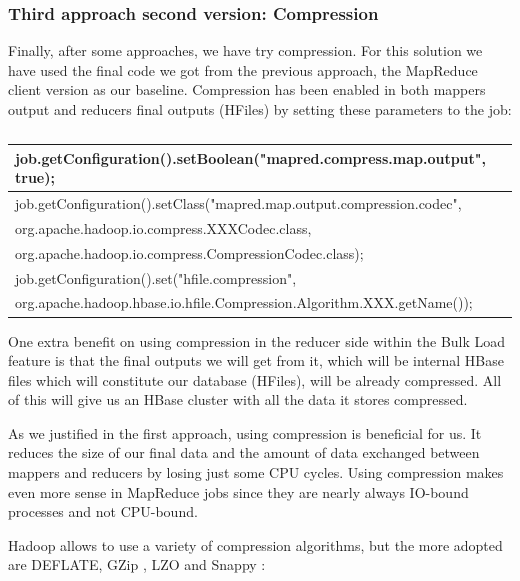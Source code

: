 \subsubsection{Third approach second version: Compression}

Finally, after some approaches, we have try compression. For this solution we have used the final code we got from the previous approach, the MapReduce client version as our baseline. Compression has been enabled in both mappers output and reducers final outputs (HFiles) by setting these parameters to the job:

\begin{table}[htbp]
\caption{}
\begin{tabular}{|l|}
\hline
job.getConfiguration().setBoolean("mapred.compress.map.output", true); \\ \hline
job.getConfiguration().setClass("mapred.map.output.compression.codec", \\ \hline
org.apache.hadoop.io.compress.XXXCodec.class, \\ \hline
org.apache.hadoop.io.compress.CompressionCodec.class); \\ \hline
job.getConfiguration().set("hfile.compression", \\ \hline
org.apache.hadoop.hbase.io.hfile.Compression.Algorithm.XXX.getName()); \\ \hline
\end{tabular}
\label{}
\end{table}

One extra benefit on using compression in the reducer side within the Bulk Load feature is that the final outputs we will get from it, which will be internal HBase files which will constitute our database (HFiles), will be already compressed. All of this will give us an HBase cluster with all the data it stores compressed.
\par
As we justified in the first approach, using compression is beneficial for us. It reduces the size of our final data and the amount of data  exchanged between mappers and reducers by losing just some CPU cycles. Using compression makes even more sense in MapReduce jobs since they are nearly always IO-bound processes and not CPU-bound.
\bigskip
\par
Hadoop allows to use a variety of compression algorithms, but the more adopted are DEFLATE, GZip \cite{GZip}, LZO and Snappy \cite{Snappy}:

